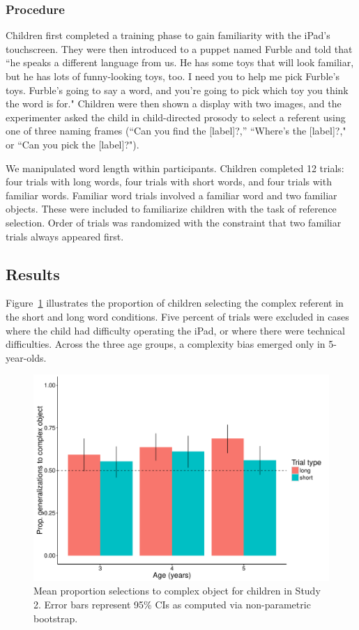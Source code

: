 \subsubsection{Procedure} 
Children first completed a training phase to gain familiarity with  the iPad's touchscreen. They were then introduced to a puppet named Furble and told that  ``he speaks a different language from us. He has some toys that will look familiar, but he has lots of funny-looking toys, too. I need you to help me pick Furble's toys. Furble's going to say a word, and you're going to pick which toy you think the word is for." Children were then shown a display with two images, and the experimenter  asked the child in child-directed prosody to select a referent using one of three naming frames (``Can you find the [label]?,'' ``Where's the [label]?,"  or ``Can you pick the [label]?").

We manipulated word length within participants. Children completed 12 trials: four trials with long words, four trials with short words, and four trials with familiar words. Familiar word trials involved a familiar word and two familiar objects. These were included to familiarize children with the task of reference selection. Order of trials was randomized with the constraint that two familiar trials always appeared first.

\subsection{Results}
Figure\ \ref{fig:study2} illustrates the proportion of children selecting the complex referent in the short and long word conditions. Five percent of trials were excluded in cases where the child had difficulty operating the iPad, or where there were technical difficulties.  Across the three age groups, a complexity bias emerged only in 5-year-olds.

\begin{figure}[t!]
\begin{center}
\includegraphics[scale = .5]{figs/chap4_2.pdf}
\end{center}
\caption{Mean proportion selections to complex object for children in Study 2. Error bars represent  95\% CIs as computed via non-parametric bootstrap. }
\label{fig:study2}
\end{figure}

